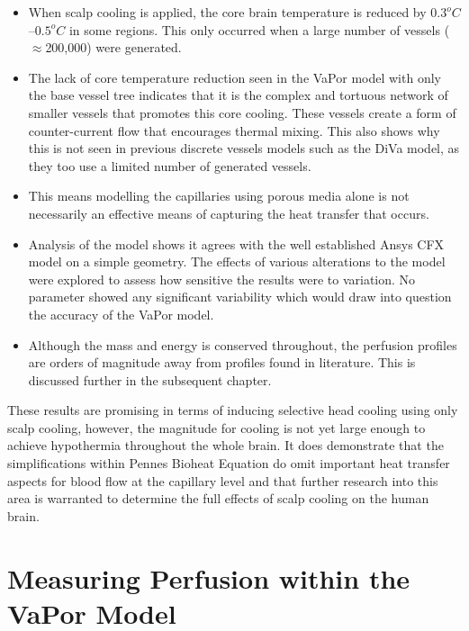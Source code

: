 \documentclass[11pt,english,a4paper,twoside,openright]{report}
\begin{document}
{{{{{{{{\begin{itemize}
	\setlength\itemsep{0em}
	\item When scalp cooling is applied, the core brain temperature is reduced by $0.3^{o}C$--$0.5^{o}C$ in some regions. This only occurred when a large number of vessels ({$\approx$}200,000) were generated.
	\item The lack of core temperature reduction seen in the VaPor model with only the base vessel tree indicates that it is the complex and tortuous network of smaller vessels that promotes this core cooling. These vessels create a form of counter-current flow that encourages thermal mixing. This also shows why this is not seen in previous discrete vessels models such as the DiVa model, as they too use a limited number of generated vessels.
	\item This means modelling the capillaries using porous media alone is not necessarily an effective means of capturing the heat transfer that occurs.
	\item Analysis of the model shows it agrees with the well established Ansys CFX model on a simple geometry. The effects of various alterations to the model were explored to assess how sensitive the results were to variation. No parameter showed any significant variability which would draw into question the accuracy of the VaPor model.
	\item Although the mass and energy is conserved throughout, the perfusion profiles are orders of magnitude away from profiles found in literature. This is discussed further in the subsequent chapter.
\end{itemize}

These results are promising in terms of inducing selective head cooling using only scalp cooling, however, the magnitude for cooling is not yet large enough to achieve hypothermia throughout the whole brain. It does demonstrate that the simplifications within Pennes Bioheat Equation do omit important heat transfer aspects for blood flow at the capillary level and that further research into this area is warranted to determine the full effects of scalp cooling on the human brain.


\newpage
\thispagestyle{empty}
\chapter[Measuring Perfusion within the VaPor Model]{{\Huge M}easuring {\Huge P}erfusion within the {\Huge V}a{\Huge P}or {\Huge M}odel}
\thispagestyle{empty}
\label{Sec:4Chapter4}

}}}}}}}}
\end{document}
